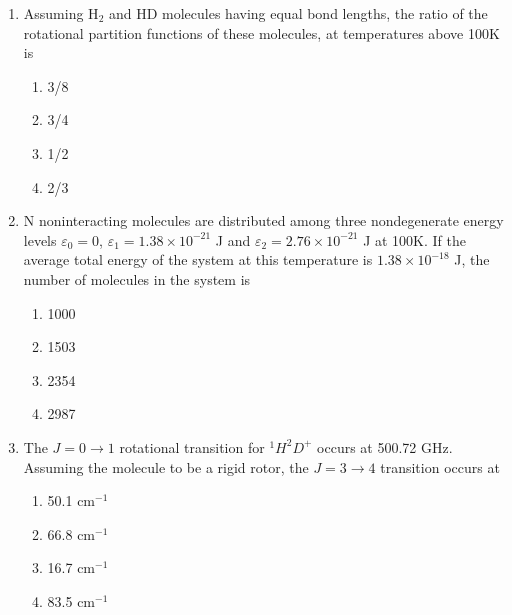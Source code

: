 \documentclass[journal,12pt,onecolumn]{IEEEtran}
\theoremstyle{remark}
\begin{document}
\begin{enumerate}
\item  Assuming H$_2$ and HD molecules having equal bond lengths, the ratio of the rotational partition functions of these molecules, at temperatures above 100K is \hfill{}
\begin{multicols}{2}
\begin{enumerate} 
    \item 3/8
    \item 3/4
    \item 1/2
    \item 2/3
\end{enumerate}
\end{multicols}

\item  N noninteracting molecules are distributed among three nondegenerate energy levels $\varepsilon_0 = 0$, $\varepsilon_1 = 1.38 \times 10^{-21}$ J and $\varepsilon_2 = 2.76 \times 10^{-21}$ J at 100K. If the average total energy of the system at this temperature is $1.38 \times 10^{-18}$ J, the number of molecules in the system is \hfill{}
\begin{multicols}{2}
\begin{enumerate} 
    \item 1000
    \item 1503
    \item 2354
    \item 2987
\end{enumerate}
\end{multicols} 
   

\item  The $J = 0 \rightarrow 1$ rotational transition for $^{1}H^{2}D^{+}$ occurs at 500.72 GHz. Assuming the molecule to be a rigid rotor, the $J = 3 \rightarrow 4$ transition occurs at \hfill{}
\begin{multicols}{2}
\begin{enumerate} 
    \item 50.1 cm$^{-1}$
    \item 66.8 cm$^{-1}$
    \item 16.7 cm$^{-1}$
    \item 83.5 cm$^{-1}$
\end{enumerate}
\end{multicols}



\end{enumerate}
\end{document}
